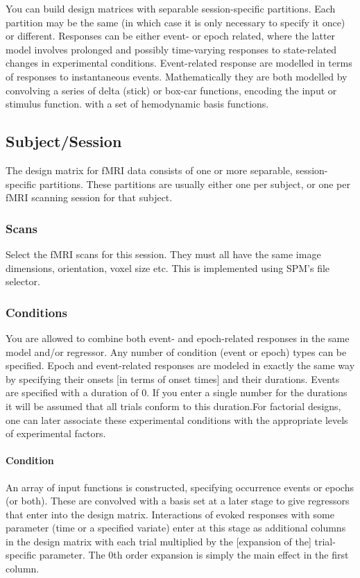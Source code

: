 You can build design matrices with separable session-specific partitions.  Each partition may be the same (in which case it is only necessary to specify it once) or different.  Responses can be either event- or epoch related, where the latter model involves prolonged and possibly time-varying responses to state-related changes in experimental conditions.  Event-related response are modelled in terms of responses to instantaneous events.  Mathematically they are both modelled by convolving a series of delta (stick) or box-car functions, encoding the input or stimulus function. with a set of hemodynamic basis functions.


\subsection{Subject/Session}
The design matrix for fMRI data consists of one or more separable, session-specific partitions.  These partitions are usually either one per subject, or one per fMRI scanning session for that subject.


\subsubsection{Scans}
Select the fMRI scans for this session.  They must all have the same image dimensions, orientation, voxel size etc. This is implemented 
using SPM's file selector.


\subsubsection{Conditions}
You are allowed to combine both event- and epoch-related responses in the same model and/or regressor. Any number of condition (event or epoch) types can be specified.  Epoch and event-related responses are modeled in exactly the same way by specifying their onsets [in terms of onset times] and their durations.  Events are specified with a duration of 0.  If you enter a single number for the durations it will be assumed that all trials conform to this duration.For factorial designs, one can later associate these experimental conditions with the appropriate levels of experimental factors. 


\paragraph{Condition}
An array of input functions is constructed, specifying occurrence events or epochs (or both). These are convolved with a basis set at a later stage to give regressors that enter into the design matrix. Interactions of evoked responses with some parameter (time or a specified variate) enter at this stage as additional columns in the design matrix with each trial multiplied by the [expansion of the] trial-specific parameter. The 0th order expansion is simply the main effect in the first column.


